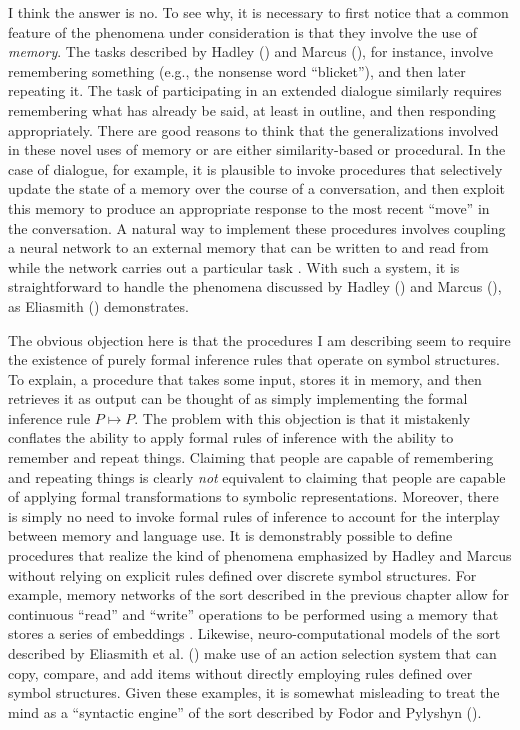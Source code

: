 I think the answer is no. To see why, it is necessary to first notice that a common feature of the phenomena under consideration is that they involve the use of \textit{memory}. The tasks described by Hadley (\citeyear{Hadley:2009}) and Marcus (\citeyear{Marcus:1998}), for instance, involve remembering something (e.g., the nonsense word ``blicket''), and then later repeating it. The task of participating in an extended dialogue similarly requires remembering what has already be said, at least in outline, and then responding appropriately. There are good reasons to think that the generalizations involved in these novel uses of memory or are either similarity-based or procedural. In the case of dialogue, for example, it is plausible to invoke procedures that selectively update the state of a memory over the course of a conversation, and then exploit this memory to produce an appropriate response to the most recent ``move'' in the conversation. A natural way to implement these procedures involves coupling a neural network to an external memory that can be written to and read from while the network carries out a particular task \citep{Weston:2016,Weston:2015,Sukhbataar:2015,Eliasmith:2012,Graves:2014}. With such a system, it is straightforward to handle the phenomena discussed by Hadley (\citeyear{Hadley:2009}) and Marcus (\citeyear{Marcus:1998}), as Eliasmith (\citeyear{Eliasmith:2013}) demonstrates. 

The obvious objection here is that the procedures I am describing seem to require the existence of purely formal inference rules that operate on symbol structures. To explain, a procedure that takes some input, stores it in memory, and then retrieves it as output can be thought of as simply implementing the formal inference rule $P \mapsto P$. The problem with this objection is that it mistakenly conflates the ability to apply formal rules of inference with the ability to remember and repeat things. Claiming that people are capable of remembering and repeating things is clearly \textit{not} equivalent to claiming that people are capable of applying formal transformations to symbolic representations. Moreover, there is simply no need to invoke formal rules of inference to account for the interplay between memory and language use. It is demonstrably possible to define procedures that realize the kind of phenomena emphasized by Hadley and Marcus without relying on explicit rules defined over discrete symbol structures. For example, memory networks of the sort described in the previous chapter allow for continuous ``read'' and ``write'' operations to be performed using a memory that stores a series of embeddings \citep{Sukhbataar:2015,Graves:2014}. Likewise, neuro-computational models of the sort described by Eliasmith et al. (\citeyear{Eliasmith:2012}) make use of an action selection system that can copy, compare, and add items without directly employing rules defined over symbol structures. Given these examples, it is somewhat misleading to treat the mind as a ``syntactic engine'' of the sort described by Fodor and Pylyshyn (\citeyear{FodorPylyshyn:1988}).

